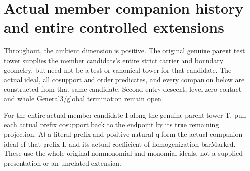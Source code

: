\section{Actual member companion history and entire controlled extensions}

Throughout, the ambient dimension is positive. The original genuine parent
test tower supplies the member candidate's entire strict carrier and boundary
geometry, but need not be a test or canonical tower for that candidate. The
actual ideal, all cosupport and order predicates, and every companion below
are constructed from that same candidate. Second-entry descent, level-zero
contact and whole General3/global termination remain open.

\begin{definition}
\label{hir:member-companion-actual-models}
\leanok
For the entire actual member candidate I along the genuine parent tower T,
pull each actual prefix cosupport back to the endpoint by its true remaining
projection. At a literal prefix and positive natural q form the actual
companion ideal of that prefix I, and its actual coefficient-of-homogenization
barMarked. These use the whole original nonmonomial and monomial ideals,
not a supplied presentation or an unrelated extension.
\end{definition}

